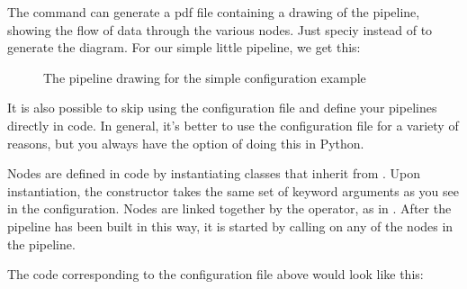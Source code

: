 \documentclass[letterpaper,10pt,english]{sphinxmanual}
\let\sphinxpxdimen\pdfpxdimen\else\newdimen\sphinxpxdimen
\begin{document}
%
\begin{sphinxVerbatim}[commandchars=\\\{\}]
  \PYG{p}{[}  \PYG{p}{]}  
\end{sphinxVerbatim}

The  command can generate a pdf file containing a drawing of the pipeline, showing the flow of data through the various nodes. Just speciy  instead of  to generate the diagram. For our simple little pipeline, we get this:

\begin{figure}[htbp]
\centering
\capstart

\noindent\sphinxincludegraphics[width=240\sphinxpxdimen]{{sample_config_drawing}.pdf}
\caption{The pipeline drawing for the simple configuration example}\label{\detokenize{overview:id3}}\end{figure}

It is also possible to skip using the configuration file and define your
pipelines directly in code. In general, it’s better to use the configuration
file for a variety of reasons, but you always have the option of doing this
in Python.

Nodes are defined in code by instantiating classes that inherit from
. Upon instantiation, the constructor takes the same set of
keyword arguments as you see in the configuration. Nodes are linked together
by the \sphinxcode{\sphinxupquote{\textgreater{}}} operator, as in . After the pipeline has been
built in this way, it is started by calling  on any
of the nodes in the pipeline.

The code corresponding to the configuration file above would look like this:
\end{document}
